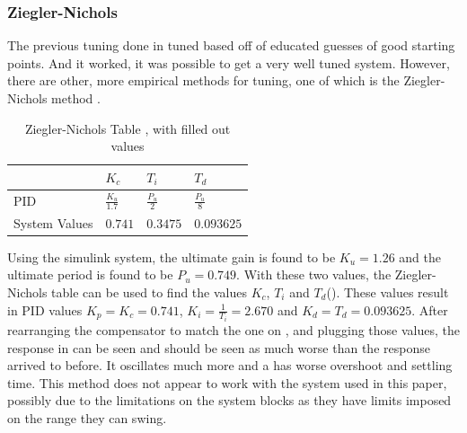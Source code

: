 \documentclass[a4paper, 11pt, compsoc]{IEEEtran}
\begin{document}
			\subsubsection{Ziegler-Nichols}
				The previous tuning done in  tuned based off of educated guesses of good starting points. And it worked, it was possible to get a very well tuned system. However, there are other, more empirical methods for tuning, one of which is the Ziegler-Nichols method \cite{elprocus}.
				\par
				\begin{table}
					
					\centering
					\begin{tabular}{l|l|l|l}
						& $K_c $ & $T_i$ & $T_d$ \\
						\hline
						PID & $\frac{K_u}{1.7}$ & $\frac{P_u}{2}$ & $\frac{P_u}{8}$\\
						\hline
						System Values & $0.741$ & $0.3475$ & $0.093625$\\
						\hline
					\end{tabular}
					\caption{Ziegler-Nichols Table \cite{elprocus}, with 
					filled out values}
					\label{tab:zn}
				\end{table}

				Using the simulink system, the ultimate gain is found to be $K_u = 1.26$ and the ultimate period is found to be $P_u = 0.749$. With these two values, the Ziegler-Nichols table can be used to find the values $K_c$, $T_i$ and $T_d$(). These values result in PID values $K_p = K_c = 0.741$, $K_i = \frac{1}{T_i} = 2.670$ and $K_d = T_d = 0.093625$. After rearranging the compensator to match the one on \cite{elprocus}, and plugging those values, the response in  can be seen and should be seen as much worse than the response arrived to before. It oscillates much more and a has worse overshoot and settling time. This method does not appear to work with the system used in this paper, possibly due to the limitations on the system blocks as they have limits imposed on the range they can swing.
\end{document}
